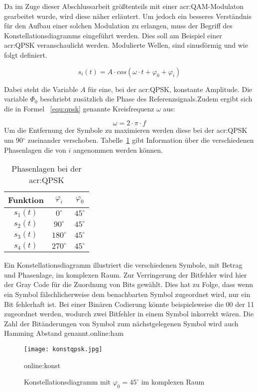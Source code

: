 Da im Zuge dieser Abschlussarbeit größtenteils mit einer \gls{acr:QAM}-Modulaton gearbeitet wurde, wird diese näher erläutert. Um jedoch ein besseres Verständnis für den Aufbau einer solchen Modulation zu erlangen, muss der Begriff des Konstellationsdiagramms eingeführt werden. Dies soll am Beispiel einer \gls{acr:QPSK} veranschaulicht werden. Modulierte Wellen, sind sinusförmig und wie folgt definiert. 

\begin{equation}
	\label{equ:qpsk}
	s_{i}(t) = A \cdot cos(\omega \cdot t+\varphi_{0}+\varphi_{i})
\end{equation}

Dabei steht die Variable $A$ für eine, bei der \gls{acr:QPSK}, konstante Amplitude. Die variable $\varPhi_{0}$ beschriebt zusätzlich die Phase des Referenzsignals.Zudem ergibt sich die in Formel ~\ref{equ:qpsk} genannte Kreisfrequenz $\omega$ aus:

\begin{equation}
	\label{equ:omega}
	\omega = 2 \cdot \pi \cdot f
\end{equation}
Um die Entfernung der Symbole zu maximieren werden diese bei der \gls{acr:QPSK} um 90$^\circ$ zueinander verschoben. Tabelle~\ref{tab:qpsk} gibt Information über die verschiedenen Phasenlagen die von $i$ angenommen werden können.
\begin{table}[htb]
\centering
		\begin{tabular}[h]{ccc}	
			\toprule
			Funktion & $\varphi_{i}$& $\varphi_{0}$ \\
			\midrule
			$s_{1}(t)$ & $0^\circ$ & $45^\circ$ \\
			$s_{2}(t)$ & $90^\circ$ & $45^\circ$\\
			$s_{3}(t)$ & $180^\circ$ & $45^\circ$\\
			$s_{4}(t)$ & $270^\circ$& $45^\circ$ \\
			\bottomrule
		\end{tabular}
		\caption{Phasenlagen bei der \gls{acr:QPSK}}
		\label{tab:qpsk}
\end{table}

Ein Konstellationsdiagramm illustriert die verschiedenen Symbole, mit Betrag und Phasenlage, im komplexen Raum. Zur Verringerung der Bitfehler wird hier der Gray Code für die Zuordnung von Bits gewählt. Dies hat zu Folge, dass wenn ein Symbol fälschlicherweise dem benachbarten Symbol zugeordnet wird, nur ein Bit fehlerhaft ist. Bei einer Binären Codierung könnte beispielsweise die 00 der 11 zugeordnet werden, wodurch zwei Bitfehler in einem Symbol inkorrekt wären. Die Zahl der Bitänderungen von Symbol zum nächstgelegenen Symbol wird auch Hamming Abstand genannt.\gls{online:ham}
\begin{figure}[H]
	\centering
	\texttt{[image: konstqpsk.jpg]}
	\caption[Konstellationsdiagramm mit $\varphi_{0}=45^\circ$ im komplexen Raum]{Konstellationsdiagramm mit $\varphi_{0}=45^\circ$ im komplexen Raum} 
	\gls{online:konst}
	\label{fig:konstqpsk}
\end{figure}

